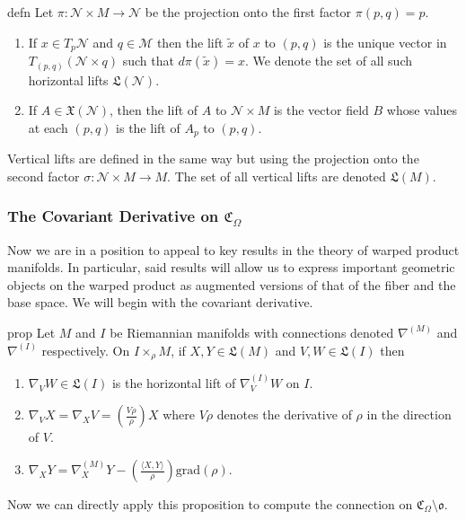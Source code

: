 \documentclass[11pt]{article}
\newcommand{\man}{M}
\begin{document}
\begin{restatable}{defn}{}
    Let $\pi: \mathcal{N} \times \man\rightarrow \mathcal{N}$ be the projection onto the first factor $\pi(p, q) = p$. 
    \begin{enumerate}
        \item If $x \in T_p\mathcal{N}$ and $q \in \mathcal{M}$ then the lift $\tilde{x}$ of $x$ to $(p,q)$ is the unique vector in $T_{(p,q)}(\mathcal{N} \times q)$ such that $d\pi(\tilde{x}) = x$. We denote the set of all such horizontal lifts $\mathfrak{L}(\mathcal{N}).$
        \item If $A \in \mathfrak{X}(\mathcal{N})$, then the lift of $A$ to $\mathcal{N} \times \man$ is the vector field $B$ whose values at each $(p,q)$ is the lift of $A_p$ to $(p,q).$
    \end{enumerate}
    Vertical lifts are defined in the same way but using the projection onto the second factor $\sigma: \mathcal{N} \times \man \rightarrow \man$. The set of all vertical lifts are denoted $\mathfrak{L}(\man).$ 
\end{restatable}

\subsubsection{The Covariant Derivative on $\mathfrak{C}_\Omega$}

Now we are in a position to appeal to key results in the theory of warped product manifolds. In particular, said results will allow us to express important geometric objects on the warped product as augmented versions of that of the fiber and the base space. We will begin with the covariant derivative.

\begin{restatable}{prop}{}
    Let $\man$ and $I$ be Riemannian manifolds with connections denoted $\nabla^{(\man)}$ and $\nabla^{(I)}$ respectively. On $I \times_\rho \man$, if $X, Y \in \mathfrak{L}(\man)$ and $V, W \in \mathfrak{L}(I)$ then
    \begin{enumerate}
        \item $\nabla_VW \in \mathfrak{L}(I)$ is the horizontal lift of $\nabla^{(I)}_VW$ on $I$.
        \item $\nabla_VX = \nabla_XV = \left(\frac{V\rho}{\rho}\right)X$ where $V\rho$ denotes the derivative of $\rho$ in the direction of $V$.
        \item $\nabla_XY = \nabla_X^{(\man)}Y - \left(\frac{\langle X, Y\rangle}{\rho}\right)\text{grad}(\rho)$.
    \end{enumerate}
\end{restatable}
\noindent Now we can directly apply this proposition to compute the connection on $\mathfrak{C}_\Omega \setminus \mathfrak{o}.$ 
\end{document}
